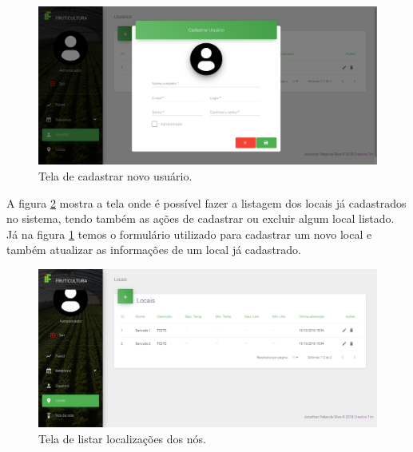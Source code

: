 \begin{figure}[H]
    \centering
    \includegraphics[scale=0.3]{04-figuras/tela_cadastrar_usuario.png}
    \caption{Tela de cadastrar novo usuário.}
    \vspace{-\baselineskip}
    \label{fig:tela-cadastrar-usuario}
\end{figure}

A figura \ref{fig:tela-listar-locais} mostra a tela onde é possível fazer a listagem dos locais já cadastrados no sistema, tendo também as ações de cadastrar ou excluir algum local listado. Já na figura \ref{fig:tela-cadastrar-usuario} temos o formulário utilizado para cadastrar um novo local e também atualizar as informações de um local já cadastrado.

\begin{figure}[H]
    \centering
    \includegraphics[scale=0.3]{04-figuras/tela_lista_locais.png}
    \caption{Tela de listar localizações dos nós.}
    \vspace{-\baselineskip}
    \label{fig:tela-listar-locais}
\end{figure}

